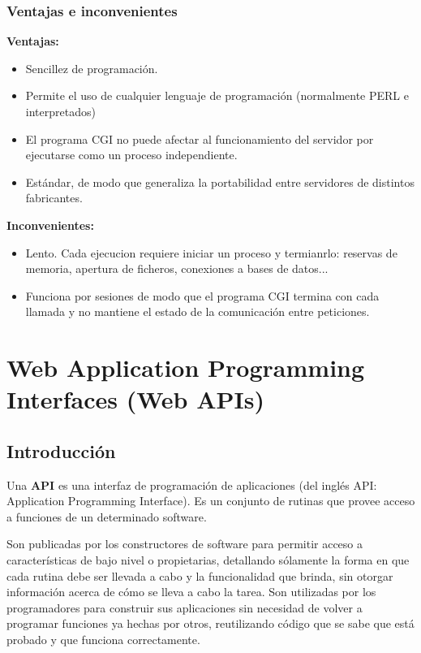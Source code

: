 \documentclass{apuntes}
\begin{document}
\subsubsection{Ventajas e inconvenientes}
\textbf{Ventajas:}
\begin{itemize}
\item Sencillez de programación.
\item Permite el uso de cualquier lenguaje de programación (normalmente PERL e interpretados)
\item El programa CGI no puede afectar al funcionamiento del servidor por ejecutarse como un proceso independiente.
\item Estándar, de modo que generaliza la portabilidad entre servidores de distintos fabricantes.
\end{itemize}
\textbf{Inconvenientes:}
\begin{itemize}
\item Lento. Cada ejecucion requiere iniciar un proceso y termianrlo: reservas de memoria, apertura de ficheros, conexiones a bases de datos...
\item Funciona por sesiones de modo que el programa CGI termina con cada llamada y no mantiene el estado de la comunicación entre peticiones.
\end{itemize}

\section{Web Application Programming Interfaces (Web APIs)}
\subsection{Introducción}
\begin{defn}[API]
Una \textbf{API} es una interfaz de programación de aplicaciones (del inglés API: Application Programming Interface). Es un conjunto de rutinas que provee acceso a funciones de un determinado software.
\end{defn}

Son publicadas por los constructores de software para permitir acceso a características de bajo nivel o propietarias, detallando sólamente la forma en que cada rutina debe ser llevada a cabo y la funcionalidad que brinda, sin otorgar información acerca de cómo se lleva a cabo la tarea. Son utilizadas por los programadores para construir sus aplicaciones sin necesidad de volver a programar funciones ya hechas por otros, reutilizando código que se sabe que está probado y que funciona correctamente.
\end{document}
